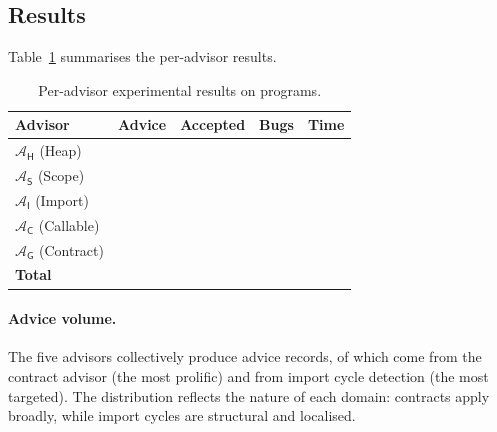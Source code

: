 \documentclass[11pt]{article}
\newcommand{\Adv}{\mathcal{A}}
\newcommand{\AdvH}{\Adv_{\mathsf{H}}}
\newcommand{\AdvS}{\Adv_{\mathsf{S}}}
\newcommand{\AdvI}{\Adv_{\mathsf{I}}}
\newcommand{\AdvC}{\Adv_{\mathsf{C}}}
\newcommand{\AdvG}{\Adv_{\mathsf{G}}}
\begin{document}
\subsection{Results}\label{sec:results}

Table~\ref{tab:results} summarises the per-advisor results.

\begin{table}[ht]
\centering
\caption{Per-advisor experimental results on \ppXCprogramCount{} programs.}
\label{tab:results}
\begin{tabular}{@{}lrrrl@{}}
\toprule
\textbf{Advisor} & \textbf{Advice} & \textbf{Accepted} & \textbf{Bugs} & \textbf{Time} \\
\midrule
$\AdvH$ (Heap)
  & \ppXCheapAdviceCount{}
  & \ppXCheapAcceptRate{}
  & \ppXCheapMutationBugs{}
  & \ppXCheapTimeMean{} \\
$\AdvS$ (Scope)
  & \ppXCscopeAdviceCount{}
  & \ppXCscopeAcceptRate{}
  & \ppXCscopeShadowDetections{}
  & \ppXCscopeTimeMean{} \\
$\AdvI$ (Import)
  & \ppXCimportCycleAdvice{}
  & \ppXCimportAcceptRate{}
  & \ppXCimportCycleAdvice{}
  & \ppXCimportTimeMean{} \\
$\AdvC$ (Callable)
  & \ppXCcallableAdviceCount{}
  & \ppXCcallableAcceptRate{}
  & \ppXCcallableBindingErrors{}
  & \ppXCcallableTimeMean{} \\
$\AdvG$ (Contract)
  & \ppXCcontractAdviceCount{}
  & \ppXCcontractAcceptRate{}
  & \ppXCcontractFixAnnotations{}
  & \ppXCcontractTimeMean{} \\
\midrule
\textbf{Total}
  & \ppXCtotalAdvice{}
  & \ppXCtotalAcceptRate{}
  & \ppXCtotalBugsFound{}
  & \ppXCtimeMean{} \\
\bottomrule
\end{tabular}
\end{table}

\paragraph{Advice volume.}
The five advisors collectively produce \ppXCtotalAdvice{} advice
records, of which \ppXCcontractAdviceCount{} come from the contract
advisor (the most prolific) and \ppXCimportCycleAdvice{} from import
cycle detection (the most targeted).  The distribution reflects the
nature of each domain: contracts apply broadly, while import cycles
are structural and localised.
\end{document}
